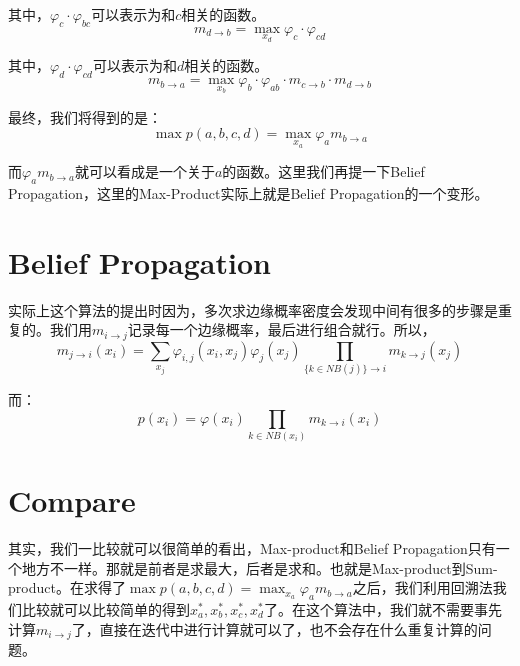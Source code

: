 \documentclass[a4paper]{article}
\begin{document}
其中，$\varphi_c\cdot \varphi_{bc}$可以表示为和$c$相关的函数。
\begin{equation}
    m_{d\longrightarrow b}=\max_{x_d} \varphi_c\cdot \varphi_{cd}
\end{equation}

其中，$\varphi_d\cdot \varphi_{cd}$可以表示为和$d$相关的函数。
\begin{equation}
    m_{b\longrightarrow a} = \max_{x_b} \varphi_b \cdot \varphi_{ab}\cdot m_{c\longrightarrow b}\cdot m_{d\longrightarrow b}
\end{equation}

最终，我们将得到的是：
\begin{equation}
    \max p(a,b,c,d) = \max_{x_a} \varphi_a m_{b\longrightarrow a}
\end{equation}

而$\varphi_a m_{b\longrightarrow a}$就可以看成是一个关于$a$的函数。这里我们再提一下Belief Propagation，这里的Max-Product实际上就是Belief Propagation的一个变形。

\section{Belief Propagation}
实际上这个算法的提出时因为，多次求边缘概率密度会发现中间有很多的步骤是重复的。我们用$m_{i\longrightarrow j}$记录每一个边缘概率，最后进行组合就行。所以，
\begin{equation}
    m_{j\longrightarrow i}(x_i) = \sum_{x_j} \varphi_{i,j}(x_i,x_j)\varphi_j(x_j) \prod_{\{k \in NB(j)\}\longrightarrow i } m_{k\longrightarrow j}(x_j)
\end{equation}

而：
\begin{equation}
    p(x_i) = \varphi(x_i) \prod_{k \in NB(x_i)} m_{k\longrightarrow i}(x_i)
\end{equation}

\section{Compare}
其实，我们一比较就可以很简单的看出，Max-product和Belief Propagation只有一个地方不一样。那就是前者是求最大，后者是求和。也就是Max-product到Sum-product。在求得了$\max p(a,b,c,d) = \max_{x_a} \varphi_a m_{b\longrightarrow a}$之后，我们利用回溯法我们比较就可以比较简单的得到$x_a^\ast,x_b^\ast,x_c^\ast,x_d^\ast$了。在这个算法中，我们就不需要事先计算$m_{i\longrightarrow j}$了，直接在迭代中进行计算就可以了，也不会存在什么重复计算的问题。
\end{document}
